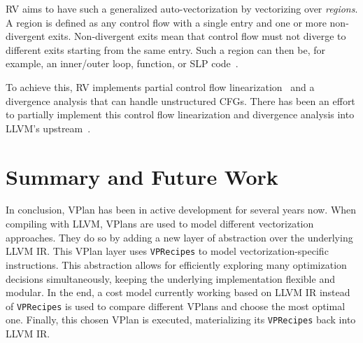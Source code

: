 \documentclass[sigplan,11pt,nonacm]{acmart}
\begin{document}
RV aims to have such a generalized auto-vectorization by vectorizing over \textit{regions}.
A region is defined as any control flow with a single entry and one or more non-divergent exits.
Non-divergent exits mean that control flow must not diverge to different exits starting from the 
same entry.
Such a region can then be, for example, an inner/outer loop, function, or SLP code~\cite{rvintro,rvproposal}.

To achieve this, RV implements partial control flow linearization~\cite{10.1145/3192366.3192413}
and a divergence analysis that can handle unstructured CFGs. There has been an effort to partially
implement this control flow linearization and divergence analysis into LLVM's 
upstream~\cite{rvproposal,rvproposaldep}.




\section{Summary and Future Work}
\label{sec:summary}
In conclusion, VPlan has been in active development for several years now. When compiling with LLVM, 
VPlans are used to model different vectorization approaches. They do so by adding a new layer of 
abstraction over the underlying LLVM IR. This VPlan layer uses \texttt{VPRecipes} to model 
vectorization-specific instructions. 
This abstraction allows for efficiently exploring many optimization decisions simultaneously, 
keeping the underlying implementation flexible and modular. In the end, a cost model currently 
working based on LLVM IR instead of \texttt{VPRecipes} is used to compare different VPlans 
and choose the most optimal one. Finally, this chosen VPlan is executed, materializing its \texttt{VPRecipes} 
back into LLVM IR.
\end{document}
